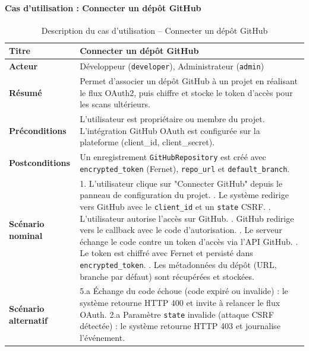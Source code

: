\paragraph{Cas d'utilisation : Connecter un dépôt GitHub}
\begin{table}[H]
\centering
\caption{Description du cas d'utilisation -- Connecter un dépôt GitHub}
\label{tab:uc-github}
\small
\renewcommand{\arraystretch}{1.3}
\begin{tabularx}{\textwidth}{>{\bfseries}p{3.5cm} X}
\hline
Titre & Connecter un dépôt GitHub \\
\hline
Acteur & Développeur (\texttt{developer}), Administrateur (\texttt{admin}) \\
\hline
Résumé & Permet d'associer un dépôt GitHub à un projet en réalisant le flux OAuth2, puis chiffre et stocke le token d'accès pour les scans ultérieurs. \\
\hline
Préconditions & L'utilisateur est propriétaire ou membre du projet. L'intégration GitHub OAuth est configurée sur la plateforme (client\_id, client\_secret). \\
\hline
Postconditions & Un enregistrement \texttt{GitHubRepository} est créé avec \texttt{encrypted\_token} (Fernet), \texttt{repo\_url} et \texttt{default\_branch}. \\
\hline
Scénario nominal &
1. L'utilisateur clique sur "Connecter GitHub" depuis le panneau de configuration du projet. \newline
2. Le système redirige vers GitHub avec le \texttt{client\_id} et un \texttt{state} CSRF. \newline
3. L'utilisateur autorise l'accès sur GitHub. \newline
4. GitHub redirige vers le callback avec le code d'autorisation. \newline
5. Le serveur échange le code contre un token d'accès via l'API GitHub. \newline
6. Le token est chiffré avec Fernet et persisté dans \texttt{encrypted\_token}. \newline
7. Les métadonnées du dépôt (URL, branche par défaut) sont récupérées et stockées. \\
\hline
Scénario alternatif &
5.a Échange du code échoue (code expiré ou invalide) : le système retourne HTTP 400 et invite à relancer le flux OAuth. \newline
2.a Paramètre \texttt{state} invalide (attaque CSRF détectée) : le système retourne HTTP 403 et journalise l'événement. \\
\hline
\end{tabularx}
\end{table}

